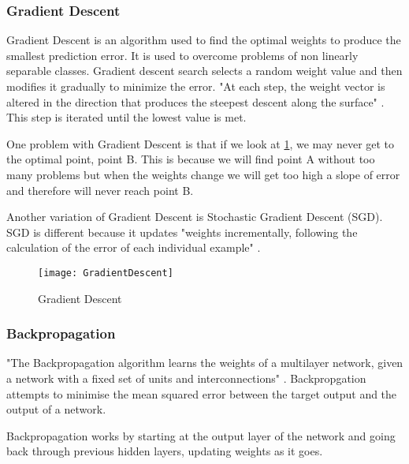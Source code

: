 \subsubsection{Gradient Descent}
Gradient Descent is an algorithm used to find the optimal weights to produce the
smallest prediction error. It is used to overcome problems of non linearly
separable classes. Gradient descent search selects a random weight value and
then modifies it gradually to minimize the error. "At each step, the weight
vector is altered in the direction that produces the steepest descent along the
surface" \textcite{MLANN}. This step is iterated until the lowest value is met.

One problem with Gradient Descent is that if we look at \ref{fig:GD}, we may
never get to the optimal point, point B. This is because we will find point A
without too many problems but when the weights change we will get too high a
slope of error and therefore will never reach point B.

Another variation of Gradient Descent is Stochastic Gradient Descent (SGD). SGD
is different because it updates "weights incrementally, following the
calculation of the error of each individual example" \textcite{MLANN}. 

\begin{figure}
      \texttt{[image: GradientDescent]}
      \caption{Gradient Descent}
      \label{fig:GD}
 \end{figure}

\subsubsection{Backpropagation}
"The Backpropagation algorithm learns the weights of a multilayer network,
given a network with a fixed set of units and interconnections" \textcite{MLANN}.
Backpropgation attempts to minimise the mean squared error between the target
output and the output of a network.

Backpropagation works by starting at the output layer of the network and going
back through previous hidden layers, updating weights as it goes.
